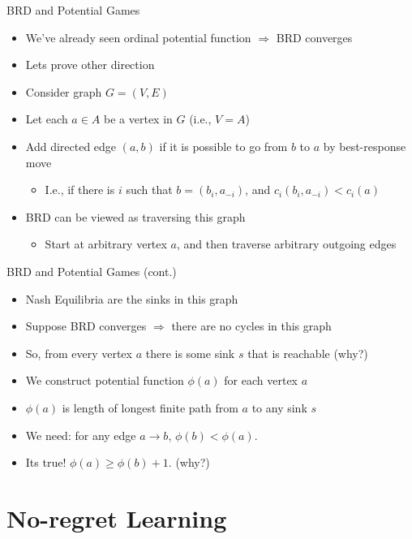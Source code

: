 \documentclass[11pt,aspectratio=169,handout]{beamer}
\begin{document}
  
  \begin{frame}{BRD and Potential Games}
   \begin{itemize}[<+->]
   \setlength{\itemsep}{0.7em}
    \item We've already seen ordinal potential function $\Rightarrow$ BRD converges
    \item Lets prove other direction
    \item Consider graph $G = (V,E)$
    \item Let each $a \in A$ be a vertex in $G$ (i.e., $V = A$)
    \item Add directed edge $(a,b)$ if it is possible to go from $b$ to $a$ by best-response move
    \begin{itemize}
     \item I.e., if there is $i$ such that $b = (b_i, a_{-i})$, and $c_i(b_i, a_{-i}) < c_i(a)$
    \end{itemize}
    \item BRD can be viewed as traversing this graph
    \begin{itemize}
     \item Start at arbitrary vertex $a$, and then traverse arbitrary outgoing edges
    \end{itemize}
   \end{itemize}
  \end{frame}


  \begin{frame}{BRD and Potential Games (cont.)}
   \begin{itemize}[<+->]
   \setlength{\itemsep}{0.7em}
    \item Nash Equilibria are the sinks in this graph
    \item Suppose BRD converges $\Rightarrow$ there are no cycles in this graph
    \item So, from every vertex $a$ there is some sink $s$ that is reachable (why?)
    \item We construct potential function $\phi(a)$ for each vertex $a$
    \item $\phi(a)$ is length of \alert{longest} finite path from $a$ to any sink $s$
    \item We need: for any edge $a \rightarrow b$, $\phi(b) < \phi(a)$.
    \item Its true! $\phi(a) \geq \phi(b) + 1$. (why?)
   \end{itemize}
  \end{frame}
  
  
 \section{No-regret Learning}
  
\end{document}
